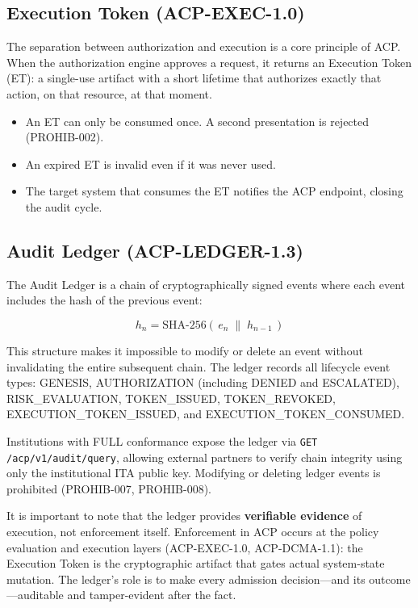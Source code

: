 \documentclass[11pt]{article}
\theoremstyle{definition}
\begin{document}
\subsection{Execution Token (ACP-EXEC-1.0)}

The separation between authorization and execution is a core principle of ACP.
When the authorization engine approves a request, it returns an Execution Token (ET):
a single-use artifact with a short lifetime that authorizes exactly that action, on that resource, at that moment.

\begin{itemize}[noitemsep]
  \item An ET can only be consumed once.
        A second presentation is rejected (PROHIB-002).
  \item An expired ET is invalid even if it was never used.
  \item The target system that consumes the ET notifies the ACP endpoint, closing the audit cycle.
\end{itemize}

\subsection{Audit Ledger (ACP-LEDGER-1.3)}

The Audit Ledger is a chain of cryptographically signed events where each event includes the hash of the previous event:

\[
h_n = \text{SHA-256}(\,e_n \;\|\; h_{n-1}\,)
\]

This structure makes it impossible to modify or delete an event without invalidating the entire subsequent chain.
The ledger records all lifecycle event types: GENESIS, AUTHORIZATION (including DENIED and ESCALATED),
RISK\_EVALUATION, TOKEN\_ISSUED, TOKEN\_REVOKED, EXECUTION\_TOKEN\_ISSUED, and EXECUTION\_TOKEN\_CONSUMED.

Institutions with FULL conformance expose the ledger via \texttt{GET /acp/v1/audit/query},
allowing external partners to verify chain integrity using only the institutional ITA public key.
Modifying or deleting ledger events is prohibited (PROHIB-007, PROHIB-008).

It is important to note that the ledger provides \textbf{verifiable evidence} of execution, not enforcement itself.
Enforcement in ACP occurs at the policy evaluation and execution layers (ACP-EXEC-1.0, ACP-DCMA-1.1):
the Execution Token is the cryptographic artifact that gates actual system-state mutation.
The ledger's role is to make every admission decision---and its outcome---auditable and tamper-evident after the fact.
\end{document}
